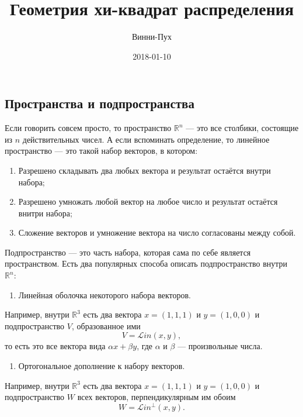 \documentclass[11pt,russian,]{article}
\title{Геометрия хи-квадрат распределения}
\author{Винни-Пух}
\date{2018-01-10}
\providecommand{\tightlist}{%
  \setlength{\itemsep}{0pt}\setlength{\parskip}{0pt}}
\newcommand{\RR}{\mathbb{R}}
\renewcommand{\Rn}{\RR^n}
\newcommand{\1}{\mathbbm{1}}
\newcommand{\Lin}{\mathcal{L}in}
\newcommand{\Linp}{\Lin^{\perp}}
\begin{document}
\maketitle

{
\setcounter{tocdepth}{2}
\tableofcontents
}
\subsection{Пространства и подпространства}\label{--}

Если говорить совсем просто, то пространство \(\Rn\) --- это все
столбики, состоящие из \(n\) действительных чисел. А если вспоминать
определение, то линейное пространство --- это такой набор векторов, в
котором:

\begin{enumerate}
\def\labelenumi{\arabic{enumi}.}
\tightlist
\item
  Разрешено складывать два любых вектора и результат остаётся внутри
  набора;
\item
  Разрешено умножать любой вектор на любое число и результат остаётся
  внитри набора;
\item
  Сложение векторов и умножение вектора на число согласованы между
  собой.
\end{enumerate}

Подпространство --- это часть набора, которая сама по себе является
пространством. Есть два популярных способа описать подпространство
внутри \(\Rn\):

\begin{enumerate}
\def\labelenumi{\arabic{enumi}.}
\tightlist
\item
  Линейная оболочка некоторого набора векторов.
\end{enumerate}

Например, внутри \(\RR^{3}\) есть два вектора \(x = (1, 1, 1)\) и
\(y = (1, 0, 0)\) и подпространство \(V\), образованное ими \[
V = \Lin (x, y),
\] то есть это все вектора вида \(\alpha x + \beta y\), где \(\alpha\) и
\(\beta\) --- произвольные числа.

\begin{enumerate}
\def\labelenumi{\arabic{enumi}.}
\setcounter{enumi}{1}
\tightlist
\item
  Ортогональное дополнение к набору векторов.
\end{enumerate}

Например, внутри \(\RR^{3}\) есть два вектора \(x = (1, 1, 1)\) и
\(y = (1, 0, 0)\) и подпространство \(W\) всех векторов,
перпендикулярным им обоим \[
W = \Linp (x, y).
\]
\end{document}
